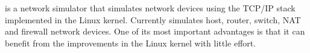 
\project is a network simulator that simulates network devices using the TCP/IP stack implemented in the Linux kernel. Currently \project simulates host, router, switch, NAT and firewall network devices. One of its most important advantages is that it can benefit from the improvements in the Linux kernel with little effort.
